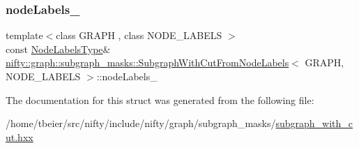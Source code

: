\mbox{\label{structnifty_1_1graph_1_1subgraph__masks_1_1SubgraphWithCutFromNodeLabels_ad5ab9c0ccfb9b5e654f60f1389df11af}} 
\subsubsection{\texorpdfstring{node\+Labels\+\_\+}{nodeLabels\_}}
{\footnotesize\ttfamily template$<$class G\+R\+A\+PH , class N\+O\+D\+E\+\_\+\+L\+A\+B\+E\+LS $>$ \\
const \hyperlink{structnifty_1_1graph_1_1subgraph__masks_1_1SubgraphWithCutFromNodeLabels_aab0ef05152a0058c18c020c8220ad30f}{Node\+Labels\+Type}\& \hyperlink{structnifty_1_1graph_1_1subgraph__masks_1_1SubgraphWithCutFromNodeLabels}{nifty\+::graph\+::subgraph\+\_\+masks\+::\+Subgraph\+With\+Cut\+From\+Node\+Labels}$<$ G\+R\+A\+PH, N\+O\+D\+E\+\_\+\+L\+A\+B\+E\+LS $>$\+::node\+Labels\+\_\+}



The documentation for this struct was generated from the following file\+:\begin{DoxyCompactItemize}
\item 
/home/tbeier/src/nifty/include/nifty/graph/subgraph\+\_\+masks/\hyperlink{subgraph__with__cut_8hxx}{subgraph\+\_\+with\+\_\+cut.\+hxx}\end{DoxyCompactItemize}
